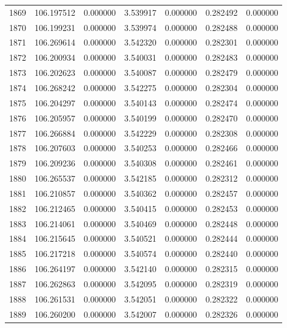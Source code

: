 \begin{tabular}{rrrrrrr}
1869 & 106.197512 &    0.000000 &  3.539917 &   0.000000 &   0.282492 &  0.000000 \\
1870 & 106.199231 &    0.000000 &  3.539974 &   0.000000 &   0.282488 &  0.000000 \\
1871 & 106.269614 &    0.000000 &  3.542320 &   0.000000 &   0.282301 &  0.000000 \\
1872 & 106.200934 &    0.000000 &  3.540031 &   0.000000 &   0.282483 &  0.000000 \\
1873 & 106.202623 &    0.000000 &  3.540087 &   0.000000 &   0.282479 &  0.000000 \\
1874 & 106.268242 &    0.000000 &  3.542275 &   0.000000 &   0.282304 &  0.000000 \\
1875 & 106.204297 &    0.000000 &  3.540143 &   0.000000 &   0.282474 &  0.000000 \\
1876 & 106.205957 &    0.000000 &  3.540199 &   0.000000 &   0.282470 &  0.000000 \\
1877 & 106.266884 &    0.000000 &  3.542229 &   0.000000 &   0.282308 &  0.000000 \\
1878 & 106.207603 &    0.000000 &  3.540253 &   0.000000 &   0.282466 &  0.000000 \\
1879 & 106.209236 &    0.000000 &  3.540308 &   0.000000 &   0.282461 &  0.000000 \\
1880 & 106.265537 &    0.000000 &  3.542185 &   0.000000 &   0.282312 &  0.000000 \\
1881 & 106.210857 &    0.000000 &  3.540362 &   0.000000 &   0.282457 &  0.000000 \\
1882 & 106.212465 &    0.000000 &  3.540415 &   0.000000 &   0.282453 &  0.000000 \\
1883 & 106.214061 &    0.000000 &  3.540469 &   0.000000 &   0.282448 &  0.000000 \\
1884 & 106.215645 &    0.000000 &  3.540521 &   0.000000 &   0.282444 &  0.000000 \\
1885 & 106.217218 &    0.000000 &  3.540574 &   0.000000 &   0.282440 &  0.000000 \\
1886 & 106.264197 &    0.000000 &  3.542140 &   0.000000 &   0.282315 &  0.000000 \\
1887 & 106.262863 &    0.000000 &  3.542095 &   0.000000 &   0.282319 &  0.000000 \\
1888 & 106.261531 &    0.000000 &  3.542051 &   0.000000 &   0.282322 &  0.000000 \\
1889 & 106.260200 &    0.000000 &  3.542007 &   0.000000 &   0.282326 &  0.000000 \\

\end{tabular}
